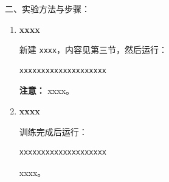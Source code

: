 \documentclass[12pt, a4paper]{article}
\begin{document}
\begin{labbox}{二、实验方法与步骤：}{}
\begin{enumerate}[leftmargin=2em, itemsep=0.5em]
    xxxx：
\begin{lstlisting}
xxxx/
  xxxx/
    xxxx/
    xxxx/
  xxxx/
    xxxx/
    xxxx/
  xxxx
\end{lstlisting}

    \item \textbf{xxxx}

    新建 \texttt{xxxx}，内容见第三节，然后运行：
\begin{lstlisting}
xxxxxxxxxxxxxxxxxxxx
\end{lstlisting}

    \textbf{注意：} xxxx。

    \item \textbf{xxxx}

    训练完成后运行：
\begin{lstlisting}
xxxxxxxxxxxxxxxxxxxx
\end{lstlisting}

    xxxx。

\end{enumerate}

\end{labbox}
\end{document}
